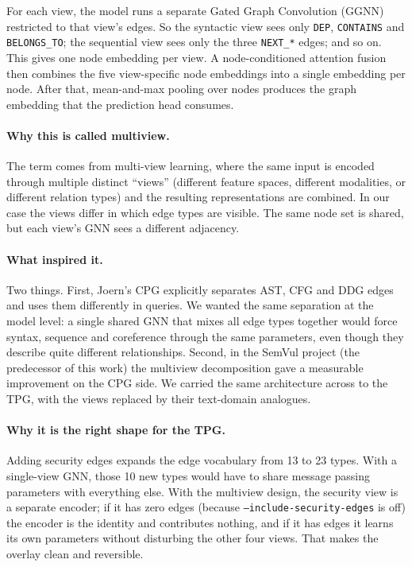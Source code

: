 \documentclass[11pt]{article}
\begin{document}
For each view, the model runs a separate Gated Graph Convolution
(GGNN) restricted to that view's edges. So the syntactic view sees
only \texttt{DEP}, \texttt{CONTAINS} and \texttt{BELONGS\_TO}; the
sequential view sees only the three \texttt{NEXT\_*} edges; and so on.
This gives one node embedding per view. A node-conditioned attention
fusion then combines the five view-specific node embeddings into a
single embedding per node. After that, mean-and-max pooling over nodes
produces the graph embedding that the prediction head consumes.

\paragraph{Why this is called multiview.}
The term comes from multi-view learning, where the same input is
encoded through multiple distinct ``views'' (different feature spaces,
different modalities, or different relation types) and the resulting
representations are combined. In our case the views differ in which
edge types are visible. The same node set is shared, but each view's
GNN sees a different adjacency.

\paragraph{What inspired it.}
Two things. First, Joern's CPG explicitly separates AST, CFG and DDG
edges and uses them differently in queries. We wanted the same
separation at the model level: a single shared GNN that mixes all
edge types together would force syntax, sequence and coreference
through the same parameters, even though they describe quite different
relationships. Second, in the SemVul project (the predecessor of this
work) the multiview decomposition gave a measurable improvement on the
CPG side. We carried the same architecture across to the TPG, with
the views replaced by their text-domain analogues.

\paragraph{Why it is the right shape for the TPG.}
Adding security edges expands the edge vocabulary from 13 to 23 types.
With a single-view GNN, those 10 new types would have to share message
passing parameters with everything else. With the multiview design, the
security view is a separate encoder; if it has zero edges (because
\texttt{--include-security-edges} is off) the encoder is the identity
and contributes nothing, and if it has edges it learns its own
parameters without disturbing the other four views. That makes the
overlay clean and reversible.
\end{document}
